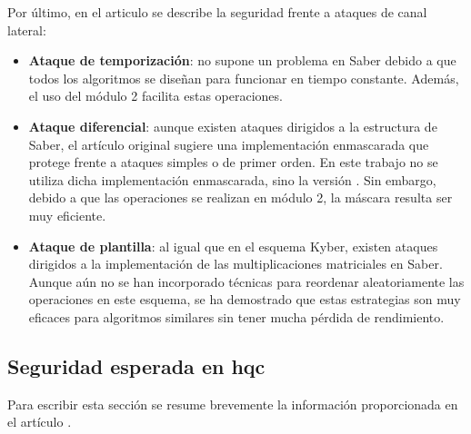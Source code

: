 Por último, en el articulo se describe la seguridad frente a ataques de canal lateral:
\begin{itemize}
	\item \textbf{Ataque de temporización}: no supone un problema en Saber debido a que todos los algoritmos se diseñan para funcionar en tiempo constante. Además, el uso del módulo 2 facilita estas operaciones.
	\item \textbf{Ataque diferencial}: aunque existen ataques dirigidos a la estructura de Saber, el artículo original sugiere una implementación enmascarada que protege frente a ataques simples o de primer orden. En este trabajo no se utiliza dicha implementación enmascarada, sino la versión . Sin embargo, debido a que las operaciones se realizan en módulo 2, la máscara resulta ser muy eficiente.
	\item \textbf{Ataque de plantilla}: al igual que en el esquema Kyber, existen ataques dirigidos a la implementación de las multiplicaciones matriciales en Saber. Aunque aún no se han incorporado técnicas para reordenar aleatoriamente las operaciones en este esquema, se ha demostrado que estas estrategias son muy eficaces para algoritmos similares sin tener mucha pérdida de rendimiento.
\end{itemize}
\newpage

\subsection{Seguridad esperada en \acrshort{hqc}}
Para escribir esta sección se resume brevemente la información proporcionada en el artículo \cite{hqc2025}.


